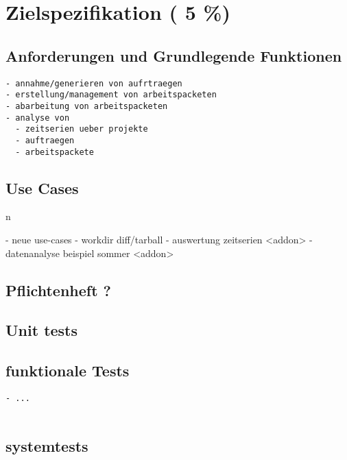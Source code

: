 \chapter{Zielspezifikation ( 5 \%)}


\section{Anforderungen und Grundlegende Funktionen}

\begin{verbatim}
- annahme/generieren von aufrtraegen
- erstellung/management von arbeitspacketen
- abarbeitung von arbeitspacketen
- analyse von
  - zeitserien ueber projekte
  - auftraegen
  - arbeitspackete
\end{verbatim}

\section{Use Cases}n

- neue use-cases
  - workdir diff/tarball
  - auswertung zeitserien <addon>
  - datenanalyse beispiel sommer <addon>

\section{Pflichtenheft ?}
\section{Unit tests}
\section{funktionale Tests}

\begin{verbatim}
- ...


\end{verbatim}

\section{systemtests}

